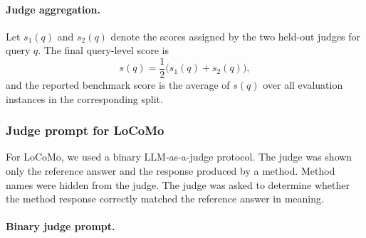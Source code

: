 \documentclass{article}
\theoremstyle{plain}
\theoremstyle{definition}
\theoremstyle{remark}
\begin{document}
\paragraph{Judge aggregation.}
Let \(s_1(q)\) and \(s_2(q)\) denote the scores assigned by the two held-out judges for query \(q\). 
The final query-level score is
\[
s(q)=\frac{1}{2}\bigl(s_1(q)+s_2(q)\bigr),
\]
and the reported benchmark score is the average of \(s(q)\) over all evaluation instances in the corresponding split.



\subsubsection{Judge prompt for LoCoMo}
\label{app:judge_prompt_locomo}

For LoCoMo, we used a binary LLM-as-a-judge protocol. The judge was shown only the reference answer and the response produced by a method. Method names were hidden from the judge. The judge was asked to determine whether the method response correctly matched the reference answer in meaning.

\paragraph{Binary judge prompt.}
\end{document}
